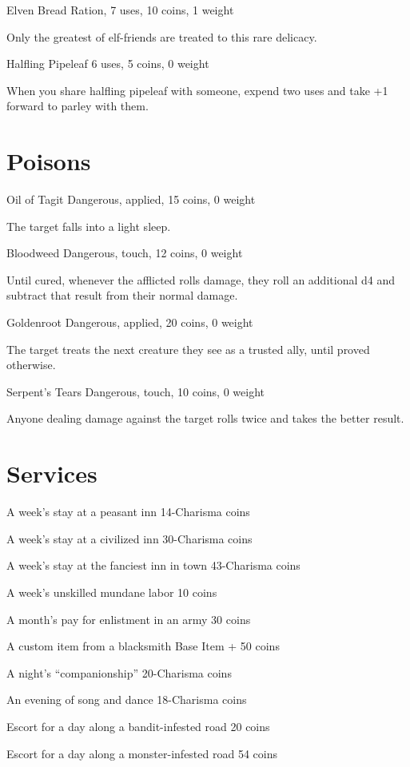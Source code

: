  Elven Bread Ration, 7 uses, 10 coins, 1 weight


 Only the greatest of elf-friends are treated to this rare delicacy.


 Halfling Pipeleaf 6 uses, 5 coins, 0 weight


 When you share halfling pipeleaf with someone, expend two uses and take +1 forward to parley with them.
\section{Poisons}


 Oil of Tagit Dangerous, applied, 15 coins, 0 weight


 The target falls into a light sleep.


 Bloodweed Dangerous, touch, 12 coins, 0 weight


 Until cured, whenever the afflicted rolls damage, they roll an additional d4 and subtract that result from their normal damage.


 Goldenroot Dangerous, applied, 20 coins, 0 weight


 The target treats the next creature they see as a trusted ally, until proved otherwise.


 Serpent's Tears Dangerous, touch, 10 coins, 0 weight


 Anyone dealing damage against the target rolls twice and takes the better result.
\section{Services}


 A week's stay at a peasant inn 14-Charisma coins


 A week's stay at a civilized inn 30-Charisma coins


 A week's stay at the fanciest inn in town 43-Charisma coins


 A week's unskilled mundane labor 10 coins


 A month's pay for enlistment in an army 30 coins


 A custom item from a blacksmith Base Item + 50 coins


 A night's ``companionship'' 20-Charisma coins


 An evening of song and dance 18-Charisma coins


 Escort for a day along a bandit-infested road 20 coins


 Escort for a day along a monster-infested road 54 coins


